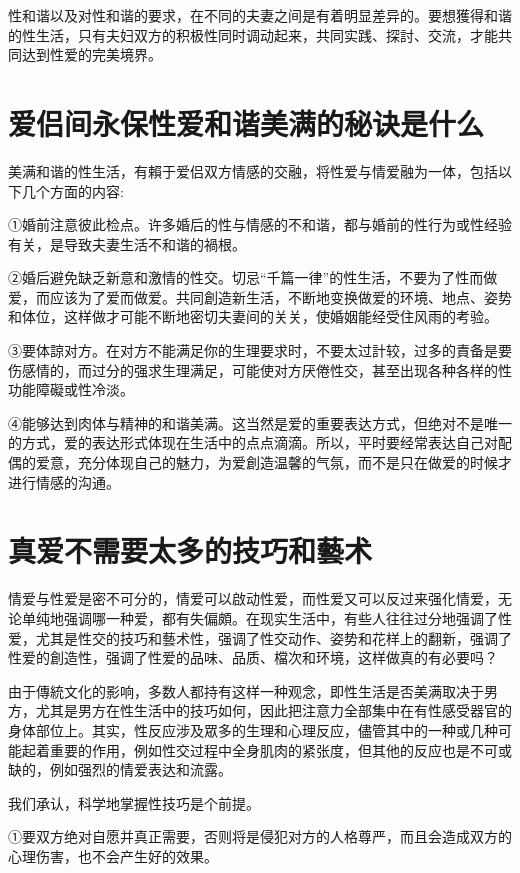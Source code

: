 \documentclass[12pt,UTF8]{ctexbook}
\begin{document}
性和谐以及对性和谐的要求，在不同的夫妻之间是有着明显差异的。要想獲得和谐的性生活，只有夫妇双方的积极性同时调动起来，共同实践、探討、交流，才能共同达到性爱的完美境界。

\section{爱侣间永保性爱和谐美满的秘诀是什么}

美满和谐的性生活，有賴于爱侣双方情感的交融，将性爱与情爱融为一体，包括以下几个方面的内容:

①婚前注意彼此检点。许多婚后的性与情感的不和谐，都与婚前的性行为或性经验有关，是导致夫妻生活不和谐的禍根。

②婚后避免缺乏新意和激情的性交。切忌“千篇一律”的性生活，不要为了性而做爱，而应该为了爱而做爱。共同創造新生活，不断地变换做爱的环境、地点、姿势和体位，这样做才可能不断地密切夫妻间的关关，使婚姻能经受住风雨的考验。

③要体諒对方。在对方不能满足你的生理要求时，不要太过計较，过多的責备是要伤感情的，而过分的强求生理满足，可能使对方厌倦性交，甚至出现各种各样的性功能障礙或性冷淡。

④能够达到肉体与精神的和谐美满。这当然是爱的重要表达方式，但绝对不是唯一的方式，爱的表达形式体现在生活中的点点滴滴。所以，平时要经常表达自己对配偶的爱意，充分体现自己的魅力，为爱創造温馨的气氛，而不是只在做爱的时候才进行情感的沟通。

\section{真爱不需要太多的技巧和藝术}

情爱与性爱是密不可分的，情爱可以啟动性爱，而性爱又可以反过来强化情爱，无论单纯地强调哪一种爱，都有失偏頗。在现实生活中，有些人往往过分地强调了性爱，尤其是性交的技巧和藝术性，强调了性交动作、姿势和花样上的翻新，强调了性爱的創造性，强调了性爱的品味、品质、檔次和环境，这样做真的有必要吗？

由于傳統文化的影响，多数人都持有这样一种观念，即性生活是否美满取决于男方，尤其是男方在性生活中的技巧如何，因此把注意力全部集中在有性感受器官的身体部位上。其实，性反应涉及眾多的生理和心理反应，儘管其中的一种或几种可能起着重要的作用，例如性交过程中全身肌肉的紧张度，但其他的反应也是不可或缺的，例如强烈的情爱表达和流露。


我们承认，科学地掌握性技巧是个前提。

①要双方绝对自愿并真正需要，否则将是侵犯对方的人格尊严，而且会造成双方的心理伤害，也不会产生好的效果。
\end{document}
